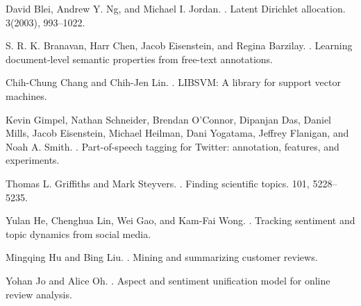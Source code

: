 \documentclass[11pt]{article}
\begin{document}
\begin{thebibliography}{}
David Blei, Andrew Y. Ng, and Michael I. Jordan.
.
\newblock Latent Dirichlet allocation.
3(2003), 993--1022.

S. R. K. Branavan, Harr Chen, Jacob Eisenstein, and Regina Barzilay.
.
\newblock Learning document-level semantic properties from free-text annotations.

Chih-Chung Chang and Chih-Jen Lin.
.
\newblock LIBSVM: A library for support vector machines.

Kevin Gimpel, Nathan Schneider, Brendan O'Connor, Dipanjan Das, Daniel Mills, Jacob Eisenstein, Michael Heilman, Dani Yogatama, Jeffrey Flanigan, and Noah A. Smith.
.
\newblock Part-of-speech tagging for Twitter: annotation, features, and experiments.

Thomas L. Griffiths and Mark Steyvers.
.
\newblock Finding scientific topics.
101, 5228--5235.

Yulan He, Chenghua Lin, Wei Gao, and Kam-Fai Wong.
.
\newblock Tracking sentiment and topic dynamics from social media.

Mingqing Hu and Bing Liu.
.
\newblock Mining and summarizing customer reviews.

Yohan Jo and Alice Oh.
.
\newblock Aspect and sentiment unification model for online review analysis.


\end{thebibliography}
\end{document}
